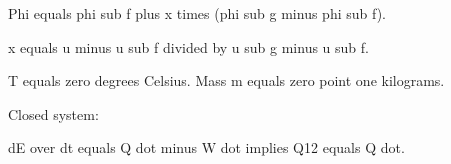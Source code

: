 Phi equals phi sub f plus x times (phi sub g minus phi sub f).  

x equals u minus u sub f divided by u sub g minus u sub f.  

T equals zero degrees Celsius. Mass m equals zero point one kilograms.  

Closed system:  

dE over dt equals Q dot minus W dot implies Q12 equals Q dot.